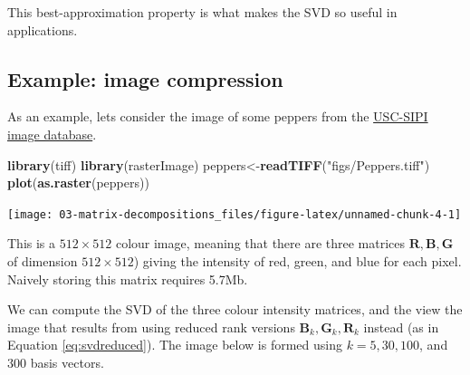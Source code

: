 \documentclass[
]{book}
\newenvironment{Shaded}{\begin{snugshade}}{\end{snugshade}}
\newcommand{\FunctionTok}[1]{\textcolor[rgb]{0.13,0.29,0.53}{\textbf{#1}}}
\newcommand{\NormalTok}[1]{#1}
\newcommand{\OtherTok}[1]{\textcolor[rgb]{0.56,0.35,0.01}{#1}}
\newcommand{\StringTok}[1]{\textcolor[rgb]{0.31,0.60,0.02}{#1}}
\theoremstyle{definition}
\theoremstyle{definition}
\theoremstyle{definition}
\theoremstyle{definition}
\theoremstyle{remark}
\begin{document}
This best-approximation property is what makes the SVD so useful in applications.

\subsection{Example: image compression}\label{example-image-compression}

As an example, lets consider the image of some peppers from the \href{http://sipi.usc.edu/database/}{USC-SIPI image database}.

\begin{Shaded}
\begin{Highlighting}[]
\FunctionTok{library}\NormalTok{(tiff)}
\FunctionTok{library}\NormalTok{(rasterImage)}
\NormalTok{peppers}\OtherTok{\textless{}{-}}\FunctionTok{readTIFF}\NormalTok{(}\StringTok{"figs/Peppers.tiff"}\NormalTok{)}
\FunctionTok{plot}\NormalTok{(}\FunctionTok{as.raster}\NormalTok{(peppers))}
\end{Highlighting}
\end{Shaded}

\texttt{[image: 03-matrix-decompositions\_files/figure-latex/unnamed-chunk-4-1]}

This is a \(512 \times 512\) colour image, meaning that there are three matrices \(\mathbf R, \mathbf B,\mathbf G\) of dimension \(512\times 512\)) giving the intensity of red, green, and blue for each pixel.
Naively storing this matrix requires 5.7Mb.

We can compute the SVD of the three colour intensity matrices, and the view the image that results from using reduced rank versions \(\mathbf B_k, \mathbf G_k, \mathbf R_k\) instead (as in Equation \eqref{eq:svdreduced}). The image below is formed using \(k=5, 30, 100\), and \(300\) basis vectors.
\end{document}
